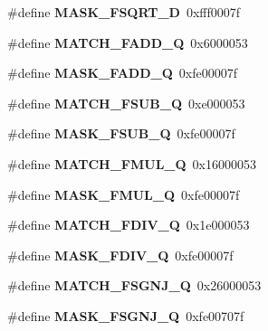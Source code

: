 \begin{DoxyCompactItemize}
\#define {\bfseries M\+A\+S\+K\+\_\+\+F\+S\+Q\+R\+T\+\_\+D}~0xfff0007f
\item 
\mbox{\label{riscv-utility_8h_a01d3368504f5080bd94479ac77f69207}} 
\#define {\bfseries M\+A\+T\+C\+H\+\_\+\+F\+A\+D\+D\+\_\+Q}~0x6000053
\item 
\mbox{\label{riscv-utility_8h_aa66f6e22610e0eb271f865a7552bb8fe}} 
\#define {\bfseries M\+A\+S\+K\+\_\+\+F\+A\+D\+D\+\_\+Q}~0xfe00007f
\item 
\mbox{\label{riscv-utility_8h_ab3fec8a6ff1f73ccc09a2e6f04f2a9d4}} 
\#define {\bfseries M\+A\+T\+C\+H\+\_\+\+F\+S\+U\+B\+\_\+Q}~0xe000053
\item 
\mbox{\label{riscv-utility_8h_ab7e5d0950960d7e7a2d6878637b4221d}} 
\#define {\bfseries M\+A\+S\+K\+\_\+\+F\+S\+U\+B\+\_\+Q}~0xfe00007f
\item 
\mbox{\label{riscv-utility_8h_a3d438f3896674027ec458dcca470556e}} 
\#define {\bfseries M\+A\+T\+C\+H\+\_\+\+F\+M\+U\+L\+\_\+Q}~0x16000053
\item 
\mbox{\label{riscv-utility_8h_a110fb8bb91e9031e58a7ae8e27922b58}} 
\#define {\bfseries M\+A\+S\+K\+\_\+\+F\+M\+U\+L\+\_\+Q}~0xfe00007f
\item 
\mbox{\label{riscv-utility_8h_af215b958b80cf6b93a03c358678b418b}} 
\#define {\bfseries M\+A\+T\+C\+H\+\_\+\+F\+D\+I\+V\+\_\+Q}~0x1e000053
\item 
\mbox{\label{riscv-utility_8h_a19114dd1ce77ed0f266bcd5e4a6e91cb}} 
\#define {\bfseries M\+A\+S\+K\+\_\+\+F\+D\+I\+V\+\_\+Q}~0xfe00007f
\item 
\mbox{\label{riscv-utility_8h_a48d77ef0743520f2f24de12500713132}} 
\#define {\bfseries M\+A\+T\+C\+H\+\_\+\+F\+S\+G\+N\+J\+\_\+Q}~0x26000053
\item 
\mbox{\label{riscv-utility_8h_af0325de6abc2881cc9910cfcc4c21c87}} 
\#define {\bfseries M\+A\+S\+K\+\_\+\+F\+S\+G\+N\+J\+\_\+Q}~0xfe00707f
\item 
\mbox{\label{riscv-utility_8h_ae69fa2d27647ce4d628e893263a1cb2b}} 

\end{DoxyCompactItemize}
